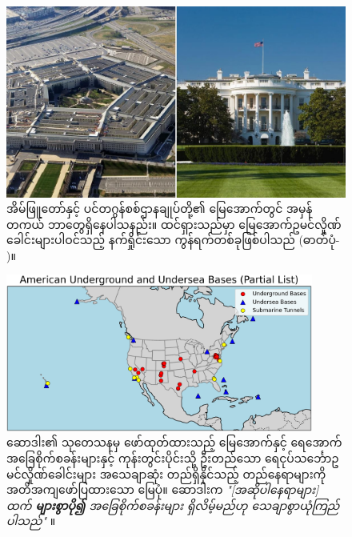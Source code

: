 \documentclass[10pt,twocolumn,letterpaper]{article}
\begin{document}
\begin{figure}[b]
\begin{center}
   \includegraphics[width=1\linewidth]{penta.jpg}
\end{center}
   \caption{အိမ်ဖြူတော်နှင့် ပင်တဂွန်စစ်ဌာနချုပ်တို့၏ မြေအောက်တွင် အမှန်တကယ် ဘာတွေရှိနေပါသနည်း။ ထင်ရှားသည်မှာ မြေအောက်ဥမင်လှိုဏ်ခေါင်းများပါဝင်သည့် နက်ရှိုင်းသော ကွန်ရက်တစ်ခုဖြစ်ပါသည် (ဓာတ်ပုံ- \cite{31})။}
\label{fig:3}
\label{fig:onecol}
\end{figure}
\begin{figure}[t]
\begin{center}
\includegraphics[width=0.9\textwidth]{basescrop.png}
\end{center}
\caption{ဆောဒါး၏ သုတေသနမှ ဖော်ထုတ်ထားသည့် မြေအောက်နှင့် ရေအောက် အခြေစိုက်စခန်းများနှင့် ကုန်းတွင်းပိုင်းသို့ ဦးတည်သော ရေငုပ်သင်္ဘောဥမင်လှိုဏ်ခေါင်းများ အသေချာဆုံး တည်ရှိနိုင်သည့် တည်နေရာများကို အတိအကျဖော်ပြထားသော မြေပုံ။ ဆောဒါးက \textit{"[အဆိုပါနေရာများ] ထက် \textbf{များစွာပို၍} အခြေစိုက်စခန်းများ ရှိလိမ့်မည်ဟု သေချာစွာယုံကြည်ပါသည်"} \cite{22}။}
\label{fig:4}
\end{figure}
\end{document}
